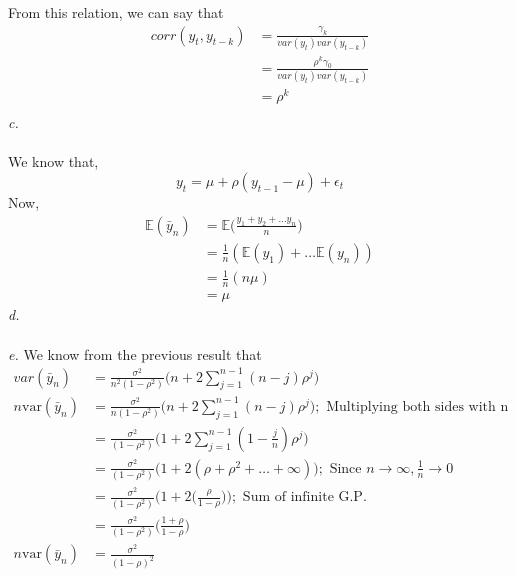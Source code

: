 \documentclass[11pt]{article}
\begin{document}
From this relation, we can say that
\begin{equation}
  \nonumber
  \begin{aligned}
    corr(y_{t}, y_{t-k}) & = \frac{\gamma_{k}}{var(y_{t})var(y_{t-k})}\\
    & = \frac{\rho^{k}\gamma_{0}}{var(y_{t})var(y_{t-k})}\\
    & = \rho^{k}\\
  \end{aligned}
\end{equation}
\emph{c.}\\ \\
We know that,
\begin{equation}
  \nonumber
  y_{t} = \mu + \rho(y_{t-1} -\mu) + \epsilon_{t}
\end{equation}
Now,
\begin{equation}
  \nonumber
  \begin{aligned}
    \mathbb{E}(\bar{y}_{n}) & = \mathbb{E}\bigg(\frac{y_{1} + y_{2} + \dots y_{n}}{n}\bigg)\\
    & = \frac{1}{n}(\mathbb{E}(y_{1}) + \dots \mathbb{E}(y_{n}))\\
    & = \frac{1}{n}(n \mu)\\
    & = \mu
  \end{aligned}
\end{equation}
\emph{d.}\\ \\
\emph{e.} We know from the previous result that
\begin{equation}
  \nonumber
  \begin{aligned}
    var(\bar{y}_{n}) & = \frac{\sigma^2}{n^{2}(1-\rho^2)}\bigg(n+2\sum_{j=1}^{n-1}(n-j)\rho^j\bigg)\\
    n\text{var}(\bar{y}_{n}) & = \frac{\sigma^2}{n(1-\rho^2)}\bigg(n+2\sum_{j=1}^{n-1}(n-j)\rho^j\bigg); \text{ Multiplying both sides with n}\\
    & = \frac{\sigma^2}{(1-\rho^2)}\bigg(1+2\sum_{j=1}^{n-1}(1-\frac{j}{n})\rho^j\bigg)\\
    & = \frac{\sigma^2}{(1-\rho^2)}\bigg(1+2(\rho + \rho^2 + \dots +\infty)\bigg); \text{ Since } n \rightarrow \infty, \frac{1}{n} \rightarrow 0\\
    & = \frac{\sigma^2}{(1-\rho^2)}\bigg(1+2\bigg(\frac{\rho}{1-\rho}\bigg)\bigg); \text{ Sum of infinite G.P.}\\
    & = \frac{\sigma^2}{(1-\rho^2)}\bigg(\frac{1+\rho}{1-\rho}\bigg)\\
    n\text{var}(\bar{y}_{n}) & =  \frac{\sigma^2}{(1-\rho)^2}
  \end{aligned}
\end{equation}
\end{document}
